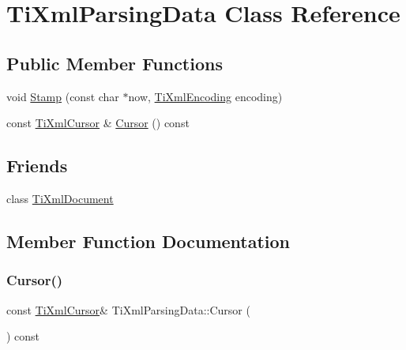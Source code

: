 \hypertarget{class_ti_xml_parsing_data}{}\section{Ti\+Xml\+Parsing\+Data Class Reference}
\label{class_ti_xml_parsing_data}
\subsection*{Public Member Functions}
\begin{DoxyCompactItemize}
\item 
void \hyperlink{class_ti_xml_parsing_data_a65cee8ab77a36c605db08c84b4c30a7d}{Stamp} (const char $\ast$now, \hyperlink{tinyxml_8h_a88d51847a13ee0f4b4d320d03d2c4d96}{Ti\+Xml\+Encoding} encoding)
\item 
const \hyperlink{struct_ti_xml_cursor}{Ti\+Xml\+Cursor} \& \hyperlink{class_ti_xml_parsing_data_a02ba4903fd3b70b43524ad60a4eece7c}{Cursor} () const
\end{DoxyCompactItemize}
\subsection*{Friends}
\begin{DoxyCompactItemize}
\item 
class \hyperlink{class_ti_xml_parsing_data_a173617f6dfe902cf484ce5552b950475}{Ti\+Xml\+Document}
\end{DoxyCompactItemize}


\subsection{Member Function Documentation}
\mbox{\label{class_ti_xml_parsing_data_a02ba4903fd3b70b43524ad60a4eece7c}} 
\subsubsection{\texorpdfstring{Cursor()}{Cursor()}}
{\footnotesize\ttfamily const \hyperlink{struct_ti_xml_cursor}{Ti\+Xml\+Cursor}\& Ti\+Xml\+Parsing\+Data\+::\+Cursor (\begin{DoxyParamCaption}{ }\end{DoxyParamCaption}) const\hspace{0.3cm}{\ttfamily [inline]}}

